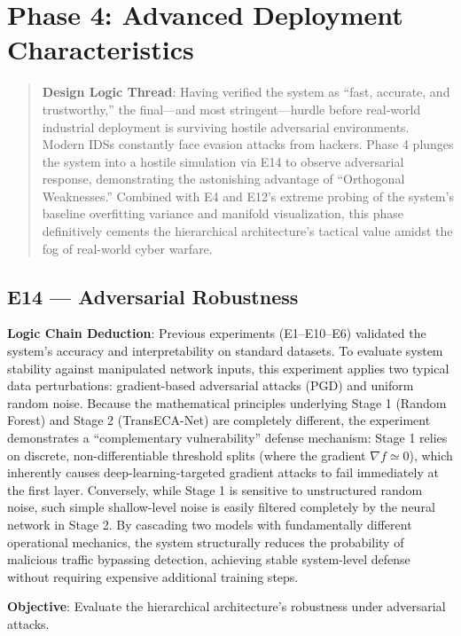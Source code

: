 \documentclass[sigconf]{acmart}
\begin{document}
\section{Phase 4: Advanced Deployment Characteristics}
\begin{quote}
\textbf{Design Logic Thread}: Having verified the system as ``fast, accurate, and trustworthy,'' the final---and most stringent---hurdle before real-world industrial deployment is surviving hostile adversarial environments. Modern IDSs constantly face evasion attacks from hackers. Phase 4 plunges the system into a hostile simulation via E14 to observe adversarial response, demonstrating the astonishing advantage of ``Orthogonal Weaknesses.'' Combined with E4 and E12's extreme probing of the system's baseline overfitting variance and manifold visualization, this phase definitively cements the hierarchical architecture's tactical value amidst the fog of real-world cyber warfare.
\end{quote}

\subsection{E14 --- Adversarial Robustness}
\textbf{Logic Chain Deduction}: Previous experiments (E1--E10--E6) validated the system's accuracy and interpretability on standard datasets. To evaluate system stability against manipulated network inputs, this experiment applies two typical data perturbations: gradient-based adversarial attacks (PGD) and uniform random noise. Because the mathematical principles underlying Stage 1 (Random Forest) and Stage 2 (TransECA-Net) are completely different, the experiment demonstrates a ``complementary vulnerability'' defense mechanism: Stage 1 relies on discrete, non-differentiable threshold splits (where the gradient $\nabla f \simeq 0$), which inherently causes deep-learning-targeted gradient attacks to fail immediately at the first layer. Conversely, while Stage 1 is sensitive to unstructured random noise, such simple shallow-level noise is easily filtered completely by the neural network in Stage 2. By cascading two models with fundamentally different operational mechanics, the system structurally reduces the probability of malicious traffic bypassing detection, achieving stable system-level defense without requiring expensive additional training steps.

\textbf{Objective}: Evaluate the hierarchical architecture's robustness under adversarial attacks.
\end{document}
